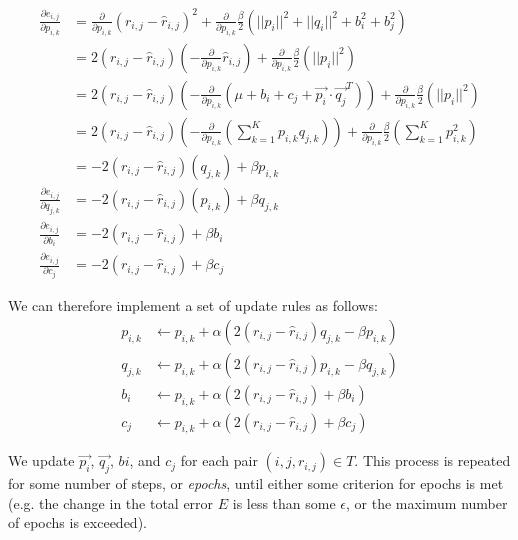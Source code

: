 \documentclass[11pt]{amsart}
\begin{document}
\begin{align*}
\frac{\partial e_{i,j}}{\partial p_{i,k}} &= \frac{\partial}{\partial p_{i,k}} \left(r_{i,j} - \hat{r}_{i,j}\right)^2 + \frac{\partial}{\partial p_{i,k}} \frac{\beta}{2} \left( ||p_i||^2 + ||q_i||^2 + b_i^2 + b_j^2 \right) \\
    &= 2 \left(r_{i,j} - \hat{r}_{i,j}\right)  \left(-\frac{\partial}{\partial p_{i,k}} \hat{r}_{i,j}\right)  + \frac{\partial}{\partial p_{i,k}} \frac{\beta}{2} \left( ||p_i||^2\right) \\
    &= 2 \left(r_{i,j} - \hat{r}_{i,j}\right)  \left(-\frac{\partial}{\partial p_{i,k}} \left(\mu + b_i + c_j + \vec{p_i} \cdot \vec{q_j}^T \right) \right)  + \frac{\partial}{\partial p_{i,k}} \frac{\beta}{2} \left( ||p_i||^2 \right) \\
    &= 2 \left(r_{i,j} - \hat{r}_{i,j}\right)  \left(-\frac{\partial}{\partial p_{i,k}} \left( \sum_{k=1}^{K} p_{i,k} q_{j,k} \right) \right)  + \frac{\partial}{\partial p_{i,k}} \frac{\beta}{2} \left( \sum_{k=1}^{K} p_{i,k}^2 \right) \\
    &= -2 \left(r_{i,j} - \hat{r}_{i,j}\right)  \left(q_{j,k} \right) + \beta p_{i,k} \\
\frac{\partial e_{i,j}}{\partial q_{j,k}} &= -2 \left(r_{i,j} - \hat{r}_{i,j}\right)  \left(p_{i,k} \right) + \beta q_{j,k} \\
\frac{\partial e_{i,j}}{\partial b_{i}} &= -2 \left(r_{i,j} - \hat{r}_{i,j}\right) + \beta b_{i} \\
\frac{\partial e_{i,j}}{\partial c_{j}} &= -2 \left(r_{i,j} - \hat{r}_{i,j}\right) + \beta c_{j}
\end{align*}

We can therefore implement a set of update rules as follows:
\begin{align*}
p_{i,k} &\gets p_{i,k} + \alpha \left(2 \left(r_{i,j} - \hat{r}_{i,j}\right)  q_{j,k} - \beta p_{i,k} \right) \\
q_{j,k} &\gets p_{i,k} + \alpha \left(2 \left(r_{i,j} - \hat{r}_{i,j}\right)  p_{i,k} - \beta q_{j,k} \right) \\
b_{i}   &\gets p_{i,k} + \alpha \left(2 \left(r_{i,j} - \hat{r}_{i,j}\right)          + \beta b_{i}   \right) \\
c_{j}   &\gets p_{i,k} + \alpha \left(2 \left(r_{i,j} - \hat{r}_{i,j}\right)          + \beta c_{j}   \right)
\end{align*}

We update $\vec{p_i}$, $\vec{q_j}$, $b{i}$, and $c_{j}$ for each pair $(i, j, r_{i,j}) \in T$. This process is repeated for some number of steps, or \emph{epochs}, until either some criterion for epochs is met (e.g. the change in the total error $E$ is less than some $\epsilon$, or the maximum number of epochs is exceeded). 
\end{document}
